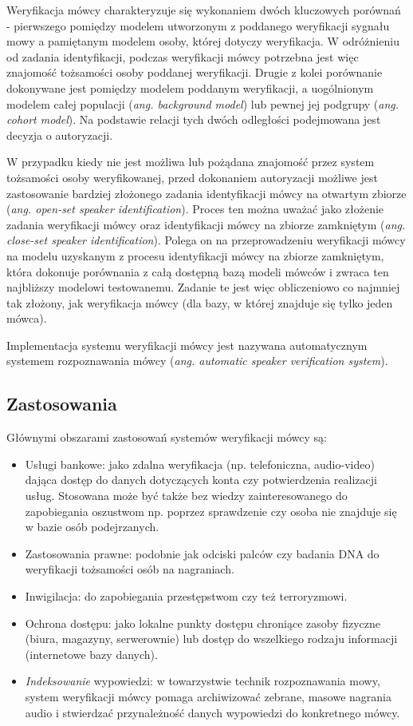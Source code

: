 Weryfikacja mówcy charakteryzuje się wykonaniem dwóch kluczowych porównań - pierwszego pomiędzy modelem utworzonym z poddanego weryfikacji sygnału mowy a pamiętanym modelem osoby, której dotyczy weryfikacja. W odróżnieniu od zadania identyfikacji, podczas weryfikacji mówcy potrzebna jest więc znajomość tożsamości osoby poddanej weryfikacji.
Drugie z kolei porównanie dokonywane jest pomiędzy modelem poddanym weryfikacji, a uogólnionym modelem całej populacji (\textit{ang. background model}) lub pewnej jej podgrupy (\textit{ang. cohort model}). Na podstawie relacji tych dwóch odległości podejmowana jest decyzja o autoryzacji.

W przypadku kiedy nie jest możliwa lub pożądana znajomość przez system tożsamości osoby weryfikowanej, przed dokonaniem autoryzacji możliwe jest zastosowanie bardziej złożonego zadania identyfikacji mówcy na otwartym zbiorze (\textit{ang. open-set speaker identification}). Proces ten można uważać jako złożenie zadania weryfikacji mówcy oraz identyfikacji mówcy na zbiorze zamkniętym (\textit{ang. close-set speaker identification}). Polega on na przeprowadzeniu weryfikacji mówcy na modelu uzyskanym z procesu identyfikacji mówcy na zbiorze zamkniętym, która dokonuje porównania z całą dostępną bazą modeli mówców i zwraca ten najbliższy modelowi testowanemu. Zadanie te jest więc obliczeniowo co najmniej tak złożony, jak weryfikacja mówcy (dla bazy, w której znajduje się tylko jeden mówca).

Implementacja systemu weryfikacji mówcy jest nazywana automatycznym systemem rozpoznawania mówcy (\textit{ang. automatic speaker verification system}).

\subsection{Zastosowania}
Głównymi obszarami zastosowań systemów weryfikacji mówcy są:
\begin{itemize}
  \item Usługi bankowe: jako zdalna weryfikacja (np. telefoniczna, audio-video) dająca dostęp do danych dotyczących konta czy potwierdzenia realizacji usług. Stosowana może być także bez wiedzy zainteresowanego do zapobiegania oszustwom np. poprzez sprawdzenie czy osoba nie znajduje się w bazie osób podejrzanych.
  \item Zastosowania prawne: podobnie jak odciski palców czy badania DNA do weryfikacji tożsamości osób na nagraniach.
  \item Inwigilacja: do zapobiegania przestępstwom czy też terroryzmowi.
  \item Ochrona dostępu: jako lokalne punkty dostępu chroniące zasoby fizyczne (biura, magazyny, serwerownie) lub dostęp do wszelkiego rodzaju informacji (internetowe bazy danych).
  \item \textit{Indeksowanie} wypowiedzi: w towarzystwie technik rozpoznawania mowy, system weryfikacji mówcy pomaga archiwizować zebrane, masowe nagrania audio i stwierdzać przynależność danych wypowiedzi do konkretnego mówcy.
\end{itemize}
